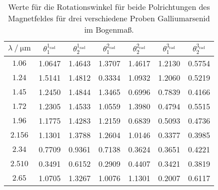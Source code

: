 \begin{table}[H]
    \centering
    \caption{Werte für die Rotationswinkel für beide Polrichtungen des Magnetfeldes für drei verschiedene Proben Galliumarsenid im Bogenmaß.}
    \label{tab:WinkelinBogenmaß}
    \begin{tabular}{S[table-format=1.3] | c c |c c | c c}
    \toprule
    {$\lambda \mathbin{/} \unit{\micro\meter}$ } & {$\theta^{1_\text{rad}}_1$} & {$\theta^{1_\text{rad}}_2$} & {$\theta^{2_\text{rad}}_1$} & {$\theta^{2_\text{rad}}_2$} & {$\theta^{3_\text{rad}}_1$} & {$\theta^{3_\text{rad}}_2$} \\
    \midrule
    {$1.06$}    & {1.0647}&   {1.4643}&   {1.3707}&   {1.4617}&   {1.2130}&  {0.5754} \\
    {$1.24$}    & {1.5141}&   {1.4812}&   {0.3334}&   {1.0932}&   {1.2060}&  {0.5219} \\
    {$1.45$}    & {1.2450}&   {1.4844}&   {1.3465}&   {0.6996}&   {0.7839}&  {0.4166} \\
    {$1.72$}    & {1.2305}&   {1.4533}&   {1.0559}&   {1.3980}&   {0.4794}&  {0.5515} \\
    {$1.96$}    & {1.1775}&   {1.4283}&   {1.2159}&   {0.6839}&   {0.5093}&  {0.4736} \\
    {$2.156$}   & {1.1301}&   {1.3788}&   {1.2604}&   {1.0146}&   {0.3377}&  {0.3985} \\
    {$2.34$}    & {0.7709}&   {0.9361}&   {0.7138}&   {0.3624}&   {0.3651}&  {0.4221} \\
    {$2.510$}   & {0.3491}&   {0.6152}&   {0.2909}&   {0.4407}&   {0.3421}&  {0.3819} \\
    {$2.65$}    & {1.0705}&   {1.3267}&   {1.0076}&   {1.1301}&   {0.2007}&  {0.6117} \\
    \bottomrule
    \end{tabular}
\end{table}


